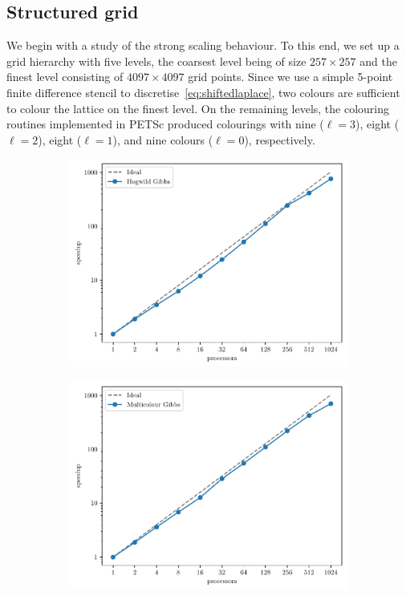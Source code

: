 \documentclass[
fontsize=11pt,
paper=a4,
numbers=noenddot
]{scrartcl}
\begin{document}
\subsection{Structured grid}
We begin with a study of the strong scaling behaviour. To this end, we set up a grid hierarchy with five levels, the coarsest level being of size $257 \times 257$ and the finest level consisting of $4097 \times 4097$ grid points. Since we use a simple 5-point finite difference stencil to discretise~\eqref{eq:shiftedlaplace}, two colours are sufficient to colour the lattice on the finest level. On the remaining levels, the colouring routines implemented in PETSc produced colourings with nine ($\ell = 3$), eight ($\ell = 2$), eight ($\ell = 1$), and nine colours ($\ell = 0$), respectively.

\begin{figure}[htbp]
    \centering
    \begin{subfigure}[b]{0.49\textwidth}
        \centering
        \includegraphics[width=\textwidth]{plots/strong_scaling_hogwild_4097x4097.pdf}
    \end{subfigure}
    \hfill
    \begin{subfigure}[b]{0.49\textwidth}
        \centering
        \includegraphics[width=\textwidth]{plots/strong_scaling_gibbs_4097x4097.pdf}

\end{subfigure}
\end{figure}
\end{document}
